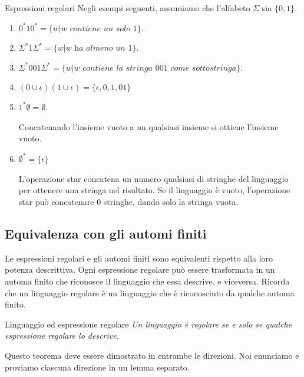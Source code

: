 \begin{Example}{Espressioni regolari}{}
Negli esempi seguenti, assumiamo che l'alfabeto $\Sigma$ sia $\{0,1\}$.
\begin{enumerate}
    \item $0^*10^* = \{w|w \textit{ contiene un solo } 1\}$.
    \item $\Sigma^*1\Sigma^* = \{w|w\textit{ ha almeno un }1\}$.
    \item $\Sigma^*001\Sigma^* = \{w|w\textit{ contiene la stringa }001\textit{ come sottostringa}\}$.
    \item $(0\cup \epsilon)(1 \cup \epsilon)= \{\epsilon, 0, 1, 01\}$
    \item $1^*\emptyset=\emptyset$.
        
    Concatenando l'insieme vuoto a un qualsiasi insieme si ottiene l'insieme vuoto.
    \item $\emptyset^* = \{\epsilon\}$

    L'operazione star concatena un numero qualsiasi di stringhe del linguaggio per ottenere una stringa nel risultato. Se il linguaggio è vuoto, l'operazione star può concatenare 0 stringhe, dando solo la stringa vuota.
\end{enumerate}
\end{Example}

\subsection{Equivalenza con gli automi finiti}
Le espressioni regolari e gli automi finiti sono equivalenti rispetto alla loro potenza descrittiva. Ogni espressione regolare può essere trasformata in un automa finito che riconosce il linguaggio che essa descrive, e viceversa. Ricorda che un linguaggio regolare è un linguaggio che è riconosciuto da qualche automa finito.

\begin{Thm}{Linguaggio ed espressione regolare}{}\label{thm:ling-espr-reg}
\textit{Un linguaggio è regolare se e solo se qualche espressione regolare lo descrive.}
\end{Thm}

Questo teorema deve essere dimostrato in entrambe le direzioni. Noi enunciamo e proviamo ciascuna direzione in un lemma separato.

